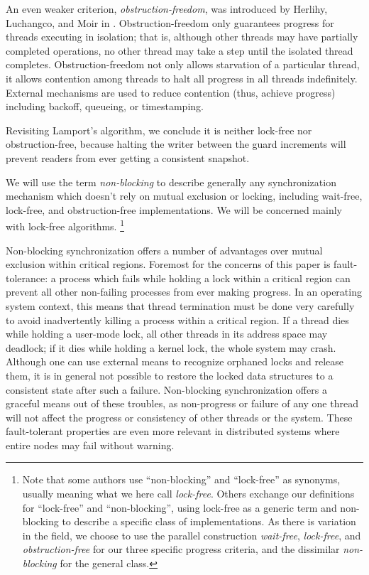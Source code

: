 \documentclass[preprint]{rdbacmconf}
\begin{document}
An even weaker criterion, \emph{obstruction-freedom}, was introduced
by Herlihy, Luchangco, and Moir in \cite{HerlihyLuMo03}.
Obstruction-freedom only guarantees progress for threads executing in
isolation; that is, although other threads may have partially
completed operations, no other thread may take a step until the
isolated thread completes.  Obstruction-freedom not only allows
starvation of a particular thread, it allows contention among threads
to halt all progress in all threads
indefinitely.  External mechanisms are used to reduce contention
(thus, achieve progress) including backoff, queueing, or timestamping.

Revisiting Lamport's algorithm, we conclude it is neither lock-free
nor obstruction-free,
because halting the writer between the guard increments will prevent
readers from ever getting a consistent snapshot.

We will use the term \emph{non-blocking} to describe
generally any synchronization mechanism which doesn't rely on mutual
exclusion or locking, including wait-free, lock-free,
and obstruction-free implementations.
We will be concerned mainly with lock-free algorithms.%
\footnote{Note that some authors use ``non-blocking'' and
  ``lock-free'' as synonyms, usually meaning what we here call
  \emph{lock-free}.  Others exchange our definitions for ``lock-free''
  and ``non-blocking'', using lock-free as a generic term and non-blocking
  to describe a specific class of implementations.  As there is
  variation in the field, we choose to use the parallel construction
  \emph{wait-free}, \emph{lock-free}, and \emph{obstruction-free} for
  our three specific progress criteria, and the dissimilar
  \emph{non-blocking} for the general class.}

Non-blocking synchronization offers a number of advantages over mutual
exclusion within critical regions.  Foremost for the concerns of this paper is
fault-tolerance:  a process which fails while holding a lock within a
critical region can prevent all other non-failing processes from
ever making progress.  In an operating system context, this means that
thread termination must be done very carefully to avoid inadvertently
killing a process within a critical region.  If a thread dies while
holding a user-mode lock, all other threads in its address space may
deadlock; if it dies while holding a kernel lock, the whole system may
crash.  Although one can use external means to recognize orphaned
locks and release them, it is in general not possible to restore the
locked data structures to a consistent state after such a failure.
Non-blocking synchronization offers a graceful means out of
these troubles, as non-progress or failure of any one thread will not
affect the progress or consistency of other threads or the system.
These fault-tolerant properties are even more relevant in
distributed systems where entire nodes may fail without warning.
\end{document}
